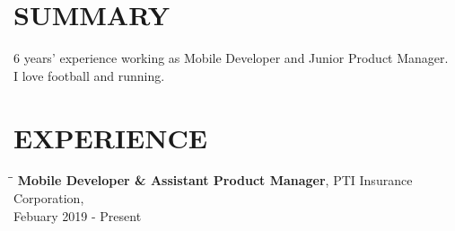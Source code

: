 \documentclass[margin, 10pt]{res}
\begin{document}
\begin{resume}
 
\section{SUMMARY}
   6 years' experience working as Mobile Developer and Junior Product Manager.\\I love football and running.
 
\section{EXPERIENCE}
   \vspace{-0.1in}

   \begin{tabbing}
   \hspace{2.0in}\= \hspace{2.0in}\= \kill %
   {\bf Mobile Developer \& Assistant Product Manager}, PTI Insurance Corporation,\\Febuary 2019 - Present
   \end{tabbing}\vspace{0pt} %


\end{resume}
\end{document}
